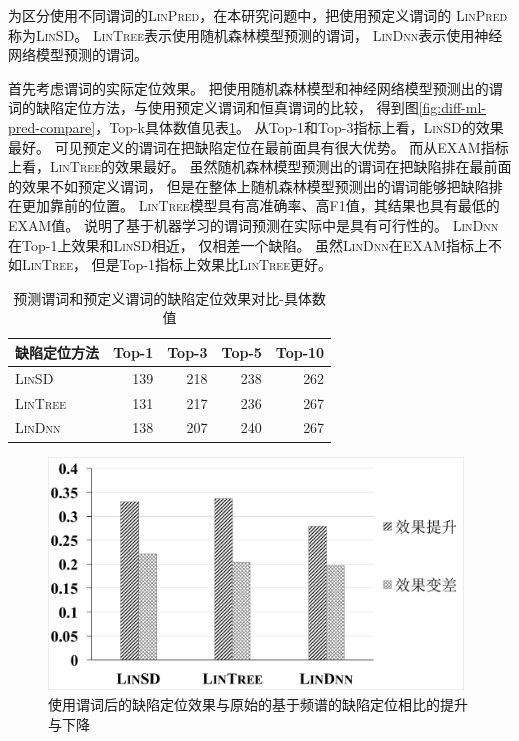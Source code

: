 为区分使用不同谓词的\textsc{LinPred}，在本研究问题中，把使用预定义谓词的 \textsc{LinPred} 称为\textsc{LinSD}。
\textsc{LinTree}表示使用随机森林模型预测的谓词，
\textsc{LinDnn}表示使用神经网络模型预测的谓词。

首先考虑谓词的实际定位效果。
把使用随机森林模型和神经网络模型预测出的谓词的缺陷定位方法，与使用预定义谓词和恒真谓词的比较，
得到图\ref{fig:diff-ml-pred-compare}，Top-k具体数值见表\ref{diff-ml-pred-compare-data}。
从Top-1和Top-3指标上看，\textsc{LinSD}的效果最好。
可见预定义的谓词在把缺陷定位在最前面具有很大优势。
而从EXAM指标上看，\textsc{LinTree}的效果最好。
虽然随机森林模型预测出的谓词在把缺陷排在最前面的效果不如预定义谓词，
但是在整体上随机森林模型预测出的谓词能够把缺陷排在更加靠前的位置。
\textsc{LinTree}模型具有高准确率、高F1值，其结果也具有最低的EXAM值。
说明了基于机器学习的谓词预测在实际中是具有可行性的。
\textsc{LinDnn}在Top-1上效果和\textsc{LinSD}相近，
仅相差一个缺陷。
虽然\textsc{LinDnn}在EXAM指标上不如\textsc{LinTree}，
但是Top-1指标上效果比\textsc{LinTree}更好。

\begin{table}
\centering
\caption{预测谓词和预定义谓词的缺陷定位效果对比-具体数值}
\begin{tabular}{|l|r|r|r|r|}
\hline
缺陷定位方法 & Top-1 & Top-3 & Top-5 & Top-10 \\
\hline
\textsc{LinSD} & 139 & 218 & 238 & 262 \\
\hline
\textsc{LinTree} & 131 & 217 & 236 & 267 \\
\hline
\textsc{LinDnn} & 138 & 207 & 240 & 267 \\
\hline
\end{tabular}
\label{diff-ml-pred-compare-data}
\end{table}

\begin{figure}[tbp] 
\centering 
\includegraphics[width=11cm]{figure/improve-deteriorate-all} 
\caption{使用谓词后的缺陷定位效果与原始的基于频谱的缺陷定位相比的提升与下降} 
\label{fig:improve-deteriorate-all}
\end{figure}


